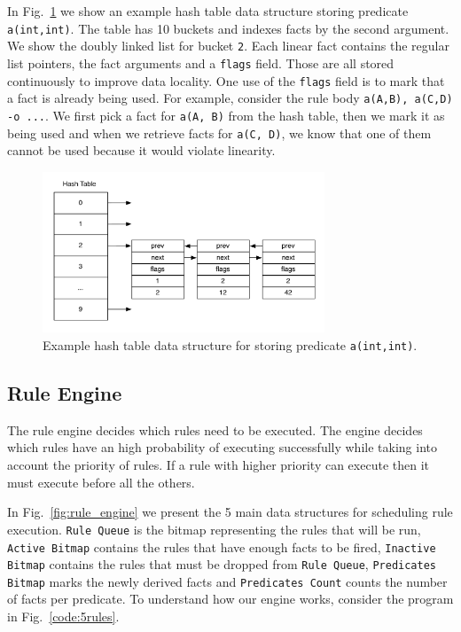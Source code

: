 In Fig.~\ref{fig:hash_table} we show an example hash table data structure storing predicate \texttt{a(int,int)}. The table
has 10 buckets and indexes facts by the second argument. We show the doubly linked list for bucket \texttt{2}. Each linear fact
contains the regular list pointers, the fact arguments and a \texttt{flags} field. Those are all stored continuously to improve data
locality. One use of the \texttt{flags} field is to mark that a fact is already being used. For example,
consider the rule body \texttt{a(A,B), a(C,D) -o ...}. We first pick a fact for \texttt{a(A, B)} from the hash table, then we mark it as
being used and when we retrieve facts for \texttt{a(C, D)}, we know that one of them cannot be used because it would
violate linearity.

\begin{figure}[h]
   \centering
   \includegraphics[width=0.75\textwidth]{hash_table.pdf}
   \caption{Example hash table data structure for storing predicate \texttt{a(int,int)}.}
   \label{fig:hash_table}
\end{figure}

\subsection{Rule Engine}\label{rule_engine}

The rule engine decides which rules need to be executed. The engine decides which rules have
an high probability of executing successfully while taking into account the priority of rules.
If a rule with higher priority can execute then it must execute before all the others. 

In Fig.~\ref{fig:rule_engine} we present the 5 main data structures for scheduling rule execution.
\texttt{Rule Queue} is the bitmap representing the rules that will be run, \texttt{Active Bitmap} contains the rules that have enough
facts to be fired, \texttt{Inactive Bitmap} contains the rules that must be dropped from \texttt{Rule Queue}, \texttt{Predicates Bitmap}
marks the newly derived facts and \texttt{Predicates Count} counts the number of facts per predicate.
To understand how our engine works, consider
the program in Fig.~\ref{code:5rules}.

